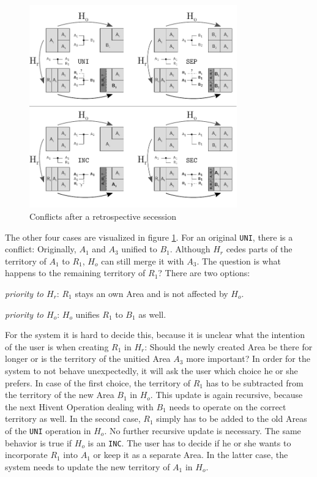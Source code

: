 \begin{figure}[ht]
\vspace{1em}
  \centering
  \includegraphics[width=0.8\textwidth]{graphics/development/update_conflict/SEC}
  \caption{Conflicts after a retrospective secession}
  \label{fig:update_conflict_SEC}
\end{figure}

The other four cases are visualized in figure \ref{fig:update_conflict_SEC}. For an original \texttt{UNI}, there is a conflict: Originally, $A_1$ and $A_3$ unified to $B_1$. Although $H_r$ cedes parts of the territory of $A_1$ to $R_1$, $H_o$ can still merge it with $A_3$. The question is what happens to the remaining territory of $R_1$? There are two options:
\begin{compactenum}
  \item
  \emph{priority to $H_r$}:
  $R_1$ stays an own Area and is not affected by $H_o$.
  \item
  \emph{priority to $H_o$}:
  $H_o$ unifies $R_1$ to $B_1$ as well.
\end{compactenum}
For the system it is hard to decide this, because it is unclear what the intention of the user is when creating $R_1$ in $H_r$: Should the newly created Area be there for longer or is the territory of the unitied Area $A_3$ more important? In order for the system to not behave unexpectedly, it will ask the user which choice he or she prefers. In case of the first choice, the territory of $R_1$ has to be subtracted from the territory of the new Area $B_1$ in $H_o$. This update is again recursive, because the next Hivent Operation dealing with $B_1$ needs to operate on the correct territory as well. In the second case, $R_1$ simply has to be added to the old Areas of the \texttt{UNI} operation in $H_o$. No further recursive update is necessary. The same behavior is true if $H_o$ is an \texttt{INC}. The user has to decide if he or she wants to incorporate $R_1$ into $A_1$ or keep it as a separate Area. In the latter case, the system needs to update the new territory of $A_1$ in $H_o$.

